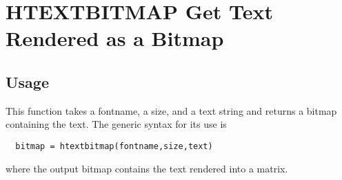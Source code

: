 \section{HTEXTBITMAP Get Text Rendered as a Bitmap}

\subsection{Usage}

This function takes a fontname, a size, and a text string
and returns a bitmap containing the text.  The generic syntax
for its use is
\begin{verbatim}
  bitmap = htextbitmap(fontname,size,text)
\end{verbatim}
where the output bitmap contains the text rendered into a matrix.
